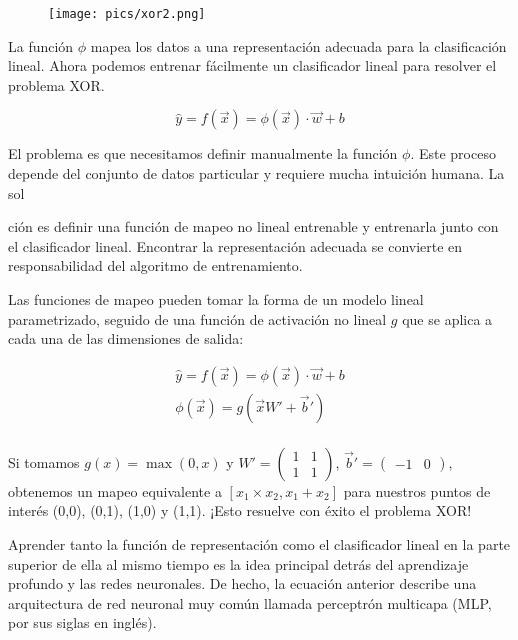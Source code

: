 \begin{figure}[htb]
	\centering
	 \texttt{[image: pics/xor2.png]}
\end{figure}

La función $\phi$ mapea los datos a una representación adecuada para la clasificación lineal. Ahora podemos entrenar fácilmente un clasificador lineal para resolver el problema XOR.

\begin{equation}
\hat{y} = f(\vec{x}) = \phi(\vec{x}) \cdot \vec{w} + b
\end{equation}

El problema es que necesitamos definir manualmente la función $\phi$. Este proceso depende del conjunto de datos particular y requiere mucha intuición humana. La sol

ción es definir una función de mapeo no lineal entrenable y entrenarla junto con el clasificador lineal. Encontrar la representación adecuada se convierte en responsabilidad del algoritmo de entrenamiento.

Las funciones de mapeo pueden tomar la forma de un modelo lineal parametrizado, seguido de una función de activación no lineal $g$ que se aplica a cada una de las dimensiones de salida:

\begin{equation}
\begin{split}
\hat{y} = f(\vec{x}) = \phi(\vec{x}) \cdot \vec{w} + b \\
\phi(\vec{x}) = g(\vec{x}W' + \vec{b}') \\
\end{split}
\end{equation}

Si tomamos $g(x) = \operatorname{max}(0, x)$ y $W' = \begin{pmatrix}
    1 & 1 \\ 1 & 1 \end{pmatrix}$, $\vec{b}' = \begin{pmatrix}
    -1 & 0 \end{pmatrix}$, obtenemos un mapeo equivalente a $[x_1 \times x_2, x_1 + x_2]$ para nuestros puntos de interés (0,0), (0,1), (1,0) y (1,1). ¡Esto resuelve con éxito el problema XOR!

Aprender tanto la función de representación como el clasificador lineal en la parte superior de ella al mismo tiempo es la idea principal detrás del aprendizaje profundo y las redes neuronales. De hecho, la ecuación anterior describe una arquitectura de red neuronal muy común llamada perceptrón multicapa (MLP, por sus siglas en inglés).

